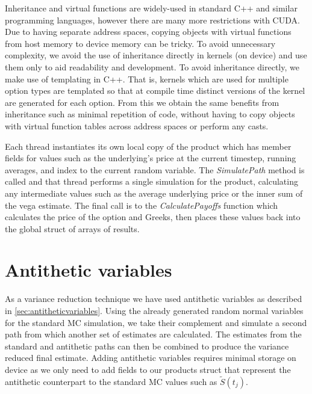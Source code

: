 Inheritance and virtual functions are widely-used in standard C++ and similar programming languages, however there are many more restrictions with CUDA. Due to having separate address spaces, copying objects with virtual functions from host memory to device memory can be tricky. To avoid unnecessary complexity, we avoid the use of inheritance directly in kernels (on device) and use them only to aid readability and development. To avoid inheritance directly, we make use of templating in C++. That is, kernels which are used for multiple option types are templated so that at compile time distinct versions of the kernel are generated for each option. From this we obtain the same benefits from inheritance such as minimal repetition of code, without having to copy objects with virtual function tables across address spaces or perform any casts. 

Each thread instantiates its own local copy of the product which has member fields for values such as the underlying's price at the current timestep, running averages, and index to the current random variable. The \textit{SimulatePath} method is called and that thread performs a single simulation for the product, calculating any intermediate values such as the average underlying price or the inner sum of the vega estimate. The final call is to the \textit{CalculatePayoffs} function which calculates the price of the option and Greeks, then places these values back into the global struct of arrays of results.

\section{Antithetic variables}
As a variance reduction technique we have used antithetic variables as described in \ref{sec:antitheticvariables}. Using the already generated random normal variables for the standard MC simulation, we take their complement and simulate a second path from which another set of estimates are calculated. The estimates from the standard and antithetic paths can then be combined to produce the variance reduced final estimate. Adding antithetic variables requires minimal storage on device as we only need to add fields to our products struct that represent the antithetic counterpart to the standard MC values such as $\widetilde{S}(t_j)$.

